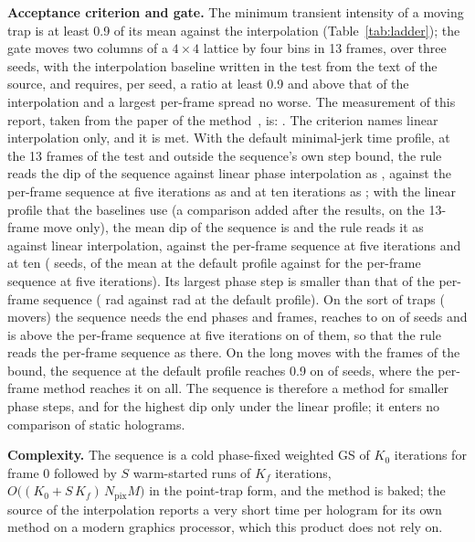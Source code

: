 \textbf{Acceptance criterion and gate.} The minimum transient intensity of a moving trap is at least 0.9 of its mean against the interpolation (Table~\ref{tab:ladder}); the gate moves two columns of a $4\times4$ lattice by four bins in 13 frames, over three seeds, with the interpolation baseline written in the test from the text of the source, and requires, per seed, a ratio at least 0.9 and above that of the interpolation and a largest per-frame spread no worse. The measurement of this report, taken from the paper of the method~\cite{flickerpaper}, is: . The criterion names linear interpolation only, and it is met. With the default minimal-jerk time profile, at the 13 frames of the test and outside the sequence's own step bound, the rule reads the dip of the sequence against linear phase interpolation as , against the per-frame sequence at five iterations as  and at ten iterations as ; with the linear profile that the baselines use (a comparison added after the results, on the 13-frame move only), the mean dip of the sequence is  and the rule reads it as  against linear interpolation,  against the per-frame sequence at five iterations and  at ten ( seeds,  of the mean at the default profile against  for the per-frame sequence at five iterations). Its largest phase step is smaller than that of the per-frame sequence ( rad against  rad at the default profile). On the sort of  traps ( movers) the sequence needs the end phases and  frames, reaches  to  on  of  seeds and is above the per-frame sequence at five iterations on  of them, so that the rule reads the per-frame sequence as  there. On the long moves with the frames of the bound, the sequence at the default profile reaches 0.9 on  of  seeds, where the per-frame method reaches it on all. The sequence is therefore a method for smaller phase steps, and for the highest dip only under the linear profile; it enters no comparison of static holograms.

\textbf{Complexity.} The sequence is a cold phase-fixed weighted GS of $K_0$ iterations for frame 0 followed by $S$ warm-started runs of $K_f$ iterations, $O\big((K_0+S\,K_f)\,N_{\mathrm{pix}}M\big)$ in the point-trap form, and the method is baked; the source of the interpolation reports a very short time per hologram for its own method on a modern graphics processor, which this product does not rely on.


